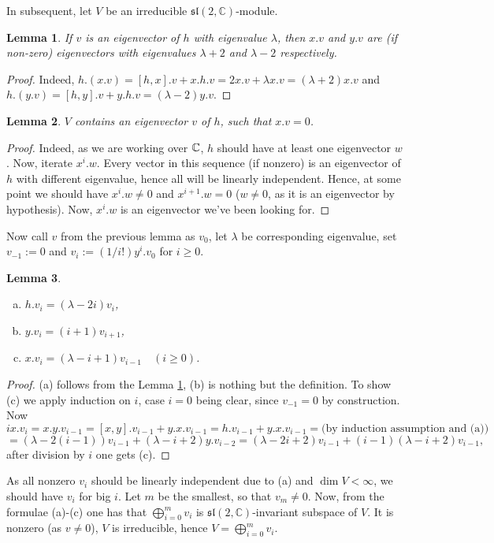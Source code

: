 \documentclass[10pt]{article} %
\newtheorem{lemma}{Lemma}
\theoremstyle{remark}
\newcommand{\sltwo}{\mathfrak{sl}(2,\mathbb{C})}
\begin{document}
In subsequent, let $V$ be an irreducible $\sltwo$-module.
\begin{lemma}\label{LambdaPlusTwoLemma}
	If $v$ is an eigenvector of $h$ with eigenvalue $\lambda$, then $x.v$ and $y.v$ are (if non-zero) eigenvectors with eigenvalues
	$\lambda+2$ and $\lambda-2$ respectively.\end{lemma}
\begin{proof}Indeed, $h.(x.v)=[h,x].v+x.h.v=2x.v+\lambda x.v=(\lambda+2)x.v$ and $h.(y.v)=[h,y].v+y.h.v=(\lambda-2)y.v$.\end{proof}
\begin{lemma}$V$ contains an eigenvector $v$ of $h$, such that $x.v=0$.\end{lemma}
\begin{proof}
	Indeed, as we are working over $\mathbb{C}$, $h$ should have at least one eigenvector $w$. Now, iterate $x^i.w$. Every vector in this sequence
	(if nonzero) is an eigenvector of $h$ with different eigenvalue, hence all will be linearly independent. Hence, at some point we should
	have $x^i.w\neq0$ and $x^{i+1}.w=0$ ($w\neq0$, as it is an eigenvector by hypothesis). Now, $x^i.w$ is an eigenvector we've been looking for.
\end{proof}
Now call $v$ from the previous lemma as $v_0$, let $\lambda$ be corresponding eigenvalue, set $v_{-1}:=0$ and $v_i:=(1/i!)y^i.v_0$ for $i\geq0$.
\begin{lemma}\mbox{}\\
	\begin{enumerate}[(a) ]
		\item $h.v_i=(\lambda-2i)v_i$,
		\item $y.v_i=(i+1)v_{i+1}$,
		\item $x.v_i=(\lambda-i+1)v_{i-1}\quad(i\geq0)$.
	\end{enumerate}
\end{lemma}
\begin{proof}
	(a) follows from the Lemma \ref{LambdaPlusTwoLemma}, (b) is nothing but the definition. To show (c) we apply induction on $i$, case
	$i=0$ being clear, since $v_{-1}=0$ by construction. Now
	\[ix.v_i=x.y.v_{i-1}=[x,y].v_{i-1}+y.x.v_{i-1}=h.v_{i-1}+y.x.v_{i-1}=\mbox{(by induction assumption and (a))}\]
	\[=(\lambda-2(i-1))v_{i-1}+(\lambda-i+2)y.v_{i-2}=(\lambda-2i+2)v_{i-1}+(i-1)(\lambda-i+2)v_{i-1},\]
	after division by $i$ one gets (c).
\end{proof}
As all nonzero $v_i$ should be linearly independent due to (a) and $\dim V<\infty$, we should have $v_i$ for big $i$. Let $m$ be the smallest,
so that $v_m\neq0$. Now, from the formulae (a)-(c) one has that $\bigoplus_{i=0}^m
v_i$ is $\sltwo$-invariant subspace of $V$. It is nonzero (as $v\neq0$),
$V$ is irreducible, hence $V=\bigoplus_{i=0}^mv_i$.
\end{document}
